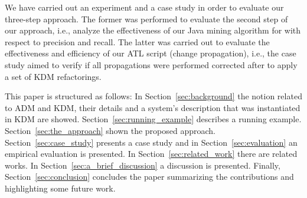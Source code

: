 We have carried out an experiment and a case study in order to evaluate our three-step approach. The former was performed to evaluate the second step of our approach, i.e., analyze the effectiveness of our Java mining algorithm for with respect to precision and recall. The latter was carried out to evaluate the effectiveness and efficiency of our ATL script (change propagation), i.e., the case study aimed to verify if all propagations were performed corrected after to apply a set of KDM refactorings.

This paper is structured as follows: In Section~\ref{sec:background} the notion related to ADM and KDM, their details and a system's description that was instantiated in KDM are showed. Section~\ref{sec:running_example} describes a running example. 
%
%
 Section~\ref{sec:the_approach} shown the proposed approach. Section~\ref{sec:case_study} presents a case study and in Section~\ref{sec:evaluation} an empirical evaluation is presented. In Section~\ref{sec:related_work} there are related works. In Section~\ref{sec:a_brief_discussion} a discussion is presented. Finally, Section~\ref{sec:conclusion} concludes the paper summarizing the contributions and highlighting some future work.





